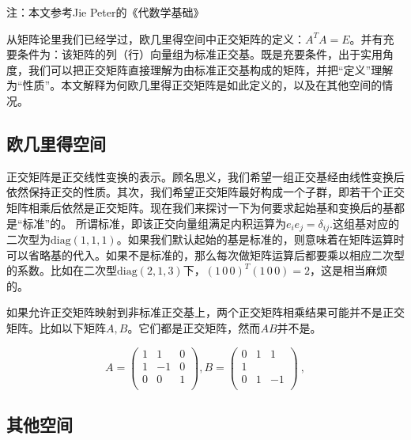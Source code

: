 

\begin{issues}
\issueTODO
\end{issues}

注：本文参考Jie Peter的《代数学基础》

从矩阵论里我们已经学过，欧几里得空间中正交矩阵的定义：$A^T A=E$。并有充要条件为：该矩阵的列（行）向量组为标准正交基。既是充要条件，出于实用角度，我们可以把正交矩阵直接理解为由标准正交基构成的矩阵，并把“定义”理解为“性质”。本文解释为何欧几里得正交矩阵是如此定义的，以及在其他空间的情况。
\subsection{欧几里得空间}
正交矩阵是正交线性变换的表示。顾名思义，我们希望一组正交基经由线性变换后依然保持正交的性质。其次，我们希望正交矩阵最好构成一个子群，即若干个正交矩阵相乘后依然是正交矩阵。现在我们来探讨一下为何要求起始基和变换后的基都是“标准”的。
所谓标准，即该正交向量组满足内积运算为$e_ie_j=\delta_{ij}$.这组基对应的二次型为$\mathrm {diag}(1,1,1)$。如果我们默认起始的基是标准的，则意味着在矩阵运算时可以省略基的代入。如果不是标准的，那么每次做矩阵运算后都要乘以相应二次型的系数。比如在二次型$\mathrm {diag}(2,1,3)$下，$(1\,0\,0)^T (1\,0\,0)=2$，这是相当麻烦的。


如果允许正交矩阵映射到非标准正交基上，两个正交矩阵相乘结果可能并不是正交矩阵。比如以下矩阵$A,B$。它们都是正交矩阵，然而$AB$并不是。

\begin{equation}
A=\begin{pmatrix}
  1&  1&  0   \\
  1&  -1&  0  \\
  0& 0 & 1   \\
\end{pmatrix},
B=\begin{pmatrix}
  0&  1&  1   \\
  1&  &    \\
  0& 1 & -1   \\
\end{pmatrix}~,
\end{equation}

\subsection{其他空间}